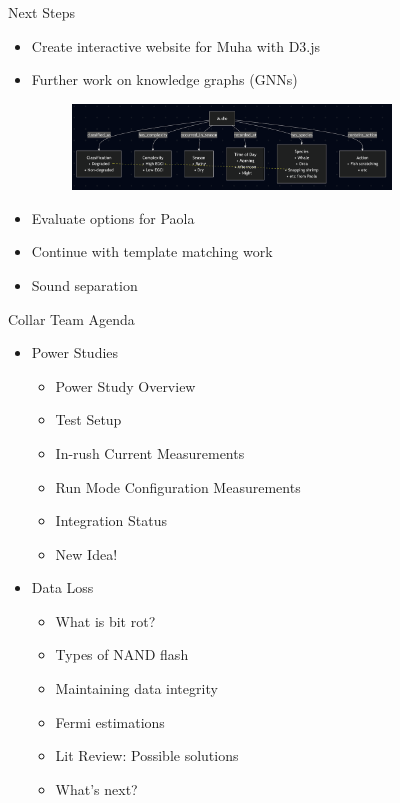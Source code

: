 \begin{frame}{Next Steps}
    \begin{itemize}
        \item Create interactive website for Muha with D3.js
        \item Further work on knowledge graphs (GNNs)
        \begin{figure}
            \centering
            \includegraphics[height=0.8\textheight,width=0.8\textwidth,keepaspectratio]{images/Knowledge graph tentative.png}
        \end{figure}
        \item Evaluate options for Paola
        \item Continue with template matching work
        \item Sound separation
    \end{itemize}
\end{frame}

\begin{frame}{Collar Team Agenda}
    \begin{itemize}
        \item Power Studies
        \begin{itemize}
            \item Power Study Overview
            \item Test Setup 
            \item In-rush Current Measurements
            \item Run Mode Configuration Measurements
            \item Integration Status
            \item New Idea!
        \end{itemize}
        \item Data Loss
        \begin{itemize}
            \item What is bit rot?
            \item Types of NAND flash
            \item Maintaining data integrity
            \item Fermi estimations
            \item Lit Review: Possible solutions
            \item What's next?
        \end{itemize}
    \end{itemize}
\end{frame}

